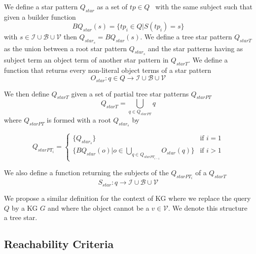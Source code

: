 \begin{definition}\label{def:starPattern}
    We define a star pattern $Q_{star}$ as a set of $tp \in Q$~\cite{Karim2020} with the same subject such that 
    given a builder function 
    \begin{equation}
        BQ_{star}(s) = \{tp_i \in Q| S(tp_i) = s\}
    \end{equation}
    with $s \in \mathcal{I} \cup \mathcal{B} \cup \mathcal{V}$ then $Q_{star_s} = BQ_{star}(s)$.
    We define a tree star pattern $Q_{starT}$ as the union between a root star pattern $Q_{star_s}$
    and the star patterns having as subject term an object term of another star pattern in $Q_{starT}$.
    We define a function that returns every non-literal object terms of a star pattern
    \begin{equation}
        O_{star}: q \in Q \rightarrow  \mathcal{I} \cup \mathcal{B} \cup \mathcal{V}
    \end{equation}

    We then define $Q_{starT}$ given a  set of partial tree star patterns $Q_{starPT}$
    \begin{equation}
        Q_{starT} = \bigcup_{q \in Q_{starPT}} q
    \end{equation}
    where $Q_{starPT}$ is formed with a root $Q_{star_s}$ by

    \begin{equation}
            Q_{starPT_i} =
        \begin{cases}
            \{Q_{star_s}\} & \text{if } i = 1 \\
            \{BQ_{star}(o)| o \in \bigcup\limits_{q \in Q_{starPT_{i-1}}} O_{star}(q)\} & \text{if } i>1
        \end{cases}
    \end{equation}

    We also define a function returning the subjects of the $Q_{starPT_i}$ of a $Q_{starT}$
    \begin{equation}
        S_{star}: q \rightarrow  \mathcal{I} \cup \mathcal{B} \cup \mathcal{V}
    \end{equation}

    We propose a similar definition for the context of KG where we replace the query $Q$ by a KG $G$ and where the object 
    cannot be a $v \in \mathcal{V}$. 
    We denote this structure a tree star.

\end{definition}

\subsection{Reachability Criteria}

